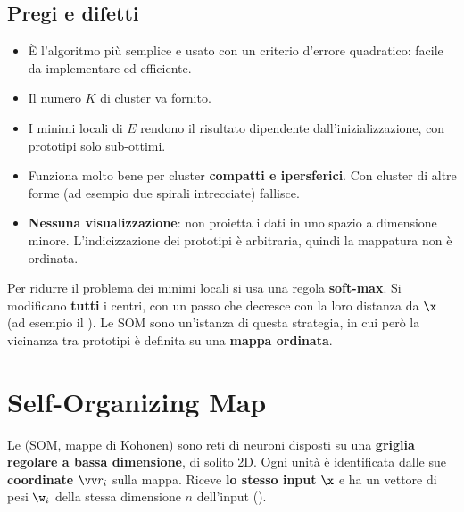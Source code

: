 \subsection{Pregi e difetti}

\begin{itemize}
  \item È l'algoritmo più semplice e usato con un criterio d'errore quadratico: facile da implementare ed efficiente.
  \item Il numero $K$ di cluster va fornito.
  \item I minimi locali di $E$ rendono il risultato dipendente dall'inizializzazione, con prototipi solo sub-ottimi.
  \item Funziona molto bene per cluster \textbf{compatti e ipersferici}. Con cluster di altre forme (ad esempio due
        spirali intrecciate) fallisce.
  \item \textbf{Nessuna visualizzazione}: non proietta i dati in uno spazio a dimensione minore. L'indicizzazione
        dei prototipi è arbitraria, quindi la mappatura non è ordinata.
\end{itemize}

Per ridurre il problema dei minimi locali si usa una regola \textbf{soft-max}. Si modificano \textbf{tutti} i centri,
con un passo che decresce con la loro distanza da $\x$ (ad esempio il ). Le SOM
sono un'istanza di questa strategia, in cui però la vicinanza tra prototipi è definita su una \textbf{mappa
ordinata}.

\section{Self-Organizing Map}

Le  (SOM, mappe di Kohonen) sono reti di neuroni disposti su una \textbf{griglia regolare
a bassa dimensione}, di solito 2D. Ogni unità è identificata dalle sue \textbf{coordinate} $\vv r_i$ sulla mappa.
Riceve \textbf{lo stesso input} $\x$ e ha un vettore di pesi $\w_i$ della stessa dimensione $n$ dell'input
().

